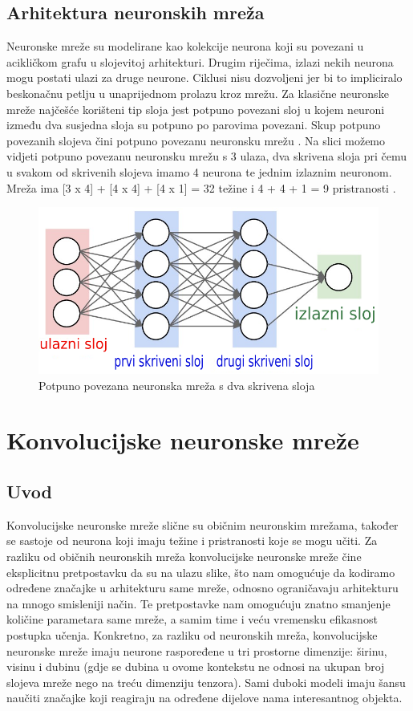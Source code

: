 \documentclass[times, utf8, diplomski]{fer}
\theoremstyle{definition}
\begin{document}
\section{Arhitektura neuronskih mreža}
Neuronske mreže su modelirane kao kolekcije neurona koji su povezani u acikličkom grafu u slojevitoj arhitekturi. Drugim riječima, izlazi nekih neurona mogu postati ulazi za druge neurone. Ciklusi nisu dozvoljeni jer bi to impliciralo beskonačnu petlju u unaprijednom prolazu kroz mrežu. Za klasične neuronske mreže najčešće korišteni tip sloja jest potpuno povezani sloj  u kojem neuroni između dva susjedna sloja su potpuno po parovima povezani. Skup potpuno povezanih slojeva čini potpuno povezanu neuronsku mrežu . Na slici možemo vidjeti potpuno povezanu neuronsku mrežu s 3 ulaza, dva skrivena sloja pri čemu u svakom od skrivenih slojeva imamo 4 neurona te jednim izlaznim neuronom. Mreža ima [3 x 4] + [4 x 4] + [4 x 1] = 32 težine i 4 + 4 + 1 = 9 pristranosti .
\begin{figure}[h]
\centering
\includegraphics[scale=0.5]{neural_net2.png}
\caption{Potpuno povezana neuronska mreža s dva skrivena sloja}
\end{figure}


\chapter{Konvolucijske neuronske mreže}
\section{Uvod}
Konvolucijske neuronske mreže slične su običnim neuronskim mrežama, također se sastoje od neurona koji imaju težine i pristranosti koje se mogu učiti. Za razliku od običnih neuronskih mreža konvolucijske neuronske mreže čine eksplicitnu pretpostavku da su na ulazu slike, što nam omogućuje da kodiramo određene značajke u arhitekturu same mreže, odnosno ograničavaju arhitekturu na mnogo smisleniji način. Te pretpostavke nam omogućuju znatno smanjenje količine parametara same mreže, a samim time i veću vremensku efikasnost postupka učenja. Konkretno, za razliku od neuronskih mreža, konvolucijske neuronske mreže imaju neurone raspoređene u tri prostorne dimenzije: širinu, visinu i dubinu (gdje se dubina u ovome kontekstu ne odnosi na ukupan broj slojeva mreže nego na treću dimenziju tenzora). Sami duboki modeli imaju šansu naučiti značajke koji reagiraju na određene dijelove nama interesantnog objekta.
\end{document}
